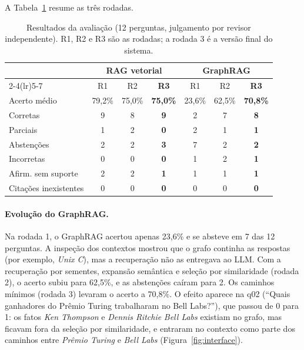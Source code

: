 A Tabela~\ref{tab:avaliacao} resume as três rodadas.

\begin{table}[ht]
\centering
\caption{Resultados da avaliação (12 perguntas, julgamento por revisor independente). R1, R2 e R3 são as rodadas; a rodada 3 é a versão final do sistema.}
\label{tab:avaliacao}
\footnotesize
\setlength{\tabcolsep}{4pt}
\begin{tabular}{lcccccc}
\toprule
 & \multicolumn{3}{c}{\textbf{RAG vetorial}} & \multicolumn{3}{c}{\textbf{GraphRAG}} \\
\cmidrule(lr){2-4}\cmidrule(lr){5-7}
 & R1 & R2 & \textbf{R3} & R1 & R2 & \textbf{R3} \\
\midrule
Acerto médio & 79,2\% & 75,0\% & \textbf{75,0\%} & 23,6\% & 62,5\% & \textbf{70,8\%} \\
Corretas & 9 & 8 & \textbf{9} & 2 & 7 & \textbf{8} \\
Parciais & 1 & 2 & \textbf{0} & 2 & 1 & \textbf{1} \\
Abstenções & 2 & 2 & \textbf{3} & 7 & 2 & \textbf{2} \\
Incorretas & 0 & 0 & \textbf{0} & 1 & 2 & \textbf{1} \\
Afirm. sem suporte & 2 & 2 & \textbf{1} & 1 & 1 & \textbf{1} \\
Citações inexistentes & 0 & 0 & \textbf{0} & 0 & 0 & \textbf{0} \\
\bottomrule
\end{tabular}
\end{table}

\paragraph{Evolução do GraphRAG.} Na rodada 1, o GraphRAG acertou apenas 23,6\% e se absteve em 7 das 12 perguntas. A inspeção dos contextos mostrou que o grafo continha as respostas (por exemplo, \emph{Unix  C}), mas a recuperação não as entregava ao LLM. Com a recuperação por sementes, expansão semântica e seleção por similaridade (rodada 2), o acerto subiu para 62,5\%, e as abstenções caíram para 2. Os caminhos mínimos (rodada 3) levaram o acerto a 70,8\%. O efeito aparece na q02 (``Quais ganhadores do Prêmio Turing trabalharam no Bell Labs?''), que passou de 0 para 1: os fatos \emph{Ken Thompson} e \emph{Dennis Ritchie}  \emph{Bell Labs} existiam no grafo, mas ficavam fora da seleção por similaridade, e entraram no contexto como parte dos caminhos entre \emph{Prêmio Turing} e \emph{Bell Labs} (Figura~\ref{fig:interface}).

